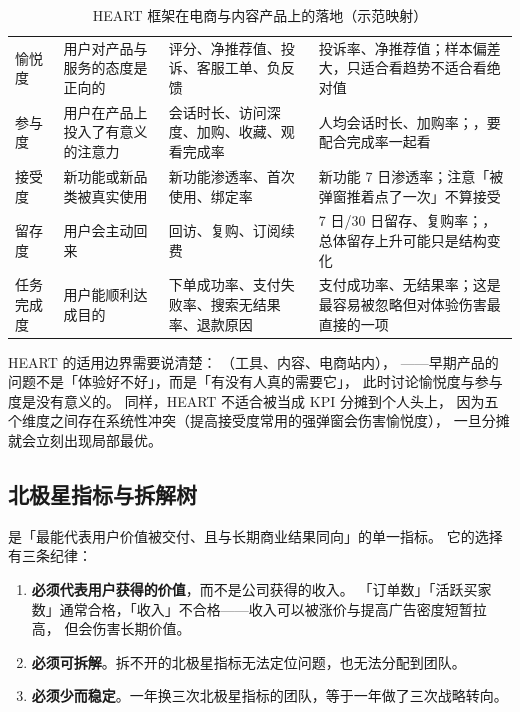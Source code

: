 \begin{table}[htbp]
\centering
\caption{HEART 框架在电商与内容产品上的落地（示范映射）}
\label{tab:growth-heart}
\small
\begin{tabularx}{\textwidth}{L{1.6cm} L{3.4cm} L{3.4cm} Y}
\toprule
{} &  &  &  \\
\midrule
愉悦度 & 用户对产品与服务的态度是正向的 & 评分、净推荐值、投诉、客服工单、负反馈 & 投诉率、净推荐值；样本偏差大，只适合看趋势不适合看绝对值 \\
\addlinespace
参与度 & 用户在产品上投入了有意义的注意力 & 会话时长、访问深度、加购、收藏、观看完成率 & 人均会话时长、加购率；，要配合完成率一起看 \\
\addlinespace
接受度 & 新功能或新品类被真实使用 & 新功能渗透率、首次使用、绑定率 & 新功能 7 日渗透率；注意「被弹窗推着点了一次」不算接受 \\
\addlinespace
留存度 & 用户会主动回来 & 回访、复购、订阅续费 & 7 日/30 日留存、复购率；，总体留存上升可能只是结构变化 \\
\addlinespace
任务完成度 & 用户能顺利达成目的 & 下单成功率、支付失败率、搜索无结果率、退款原因 & 支付成功率、无结果率；这是最容易被忽略但对体验伤害最直接的一项 \\
\bottomrule
\end{tabularx}
\end{table}

HEART 的适用边界需要说清楚：
（工具、内容、电商站内），
——早期产品的问题不是「体验好不好」，而是「有没有人真的需要它」，
此时讨论愉悦度与参与度是没有意义的。
同样，HEART 不适合被当成 KPI 分摊到个人头上，
因为五个维度之间存在系统性冲突（提高接受度常用的强弹窗会伤害愉悦度），
一旦分摊就会立刻出现局部最优。

\subsection{北极星指标与拆解树}

 是「最能代表用户价值被交付、且与长期商业结果同向」的单一指标。
它的选择有三条纪律：

\begin{enumerate}
  \item \textbf{必须代表用户获得的价值}，而不是公司获得的收入。
        「订单数」「活跃买家数」通常合格，「收入」不合格——收入可以被涨价与提高广告密度短暂拉高，
        但会伤害长期价值。
  \item \textbf{必须可拆解}。拆不开的北极星指标无法定位问题，也无法分配到团队。
  \item \textbf{必须少而稳定}。一年换三次北极星指标的团队，等于一年做了三次战略转向。
\end{enumerate}

